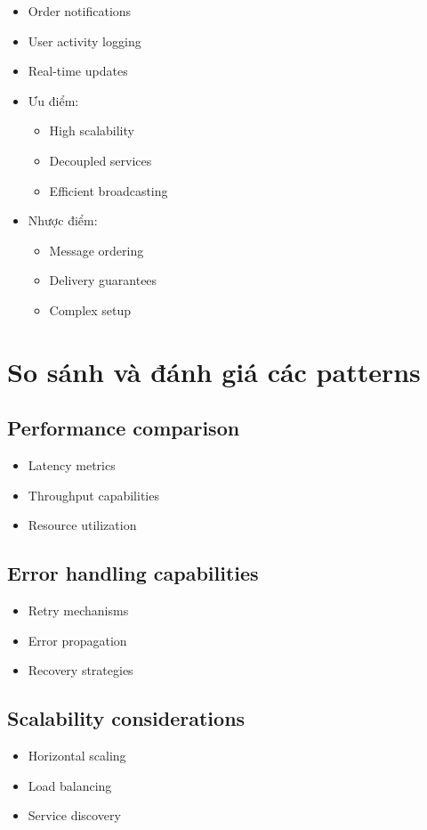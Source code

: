 \begin{itemize}
    \item Order notifications
    \item User activity logging
    \item Real-time updates
\end{itemize}

\begin{itemize}
    \item Ưu điểm:
    \begin{itemize}
        \item High scalability
        \item Decoupled services
        \item Efficient broadcasting
    \end{itemize}
    \item Nhược điểm:
    \begin{itemize}
        \item Message ordering
        \item Delivery guarantees
        \item Complex setup
    \end{itemize}
\end{itemize}

\section{So sánh và đánh giá các patterns}
\subsection{Performance comparison}
\begin{itemize}
    \item Latency metrics
    \item Throughput capabilities
    \item Resource utilization
\end{itemize}

\subsection{Error handling capabilities}
\begin{itemize}
    \item Retry mechanisms
    \item Error propagation
    \item Recovery strategies
\end{itemize}

\subsection{Scalability considerations}
\begin{itemize}
    \item Horizontal scaling
    \item Load balancing
    \item Service discovery
\end{itemize} 